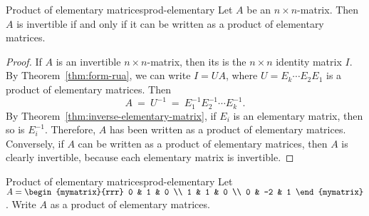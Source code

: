 \begin{theorem}{Product of elementary matrices}{prod-elementary}
  Let $A$ be an $n \times n$-matrix. Then $A$ is invertible if and
  only if it can be written as a product of elementary matrices.
\end{theorem}

\begin{proof}
  If $A$ is an invertible $n\times n$-matrix, then its {\rref} is the
  $n\times n$ identity matrix $I$. By Theorem~\ref{thm:form-rua}, we
  can write $I=UA$, where $U = E_k\cdots E_2E_1$ is a product of
  elementary matrices. Then
  \begin{equation*}
    A ~=~ U^{-1} ~=~ E_1^{-1}E_2^{-1}\cdots E_k^{-1}.
  \end{equation*}
  By Theorem~\ref{thm:inverse-elementary-matrix}, if $E_i$ is an
  elementary matrix, then so is $E_i^{-1}$. Therefore, $A$ has been
  written as a product of elementary matrices. Conversely, if $A$ can
  be written as a product of elementary matrices, then $A$ is clearly
  invertible, because each elementary matrix is invertible.
\end{proof}

\begin{example}{Product of elementary matrices}{prod-elementary}
  Let $A = \begin{mymatrix}{rrr}
    0 &  1 & 0 \\
    1 &  1 & 0 \\
    0 & -2 & 1
  \end{mymatrix}$.
  Write $A$ as a product of elementary matrices.
\end{example}

